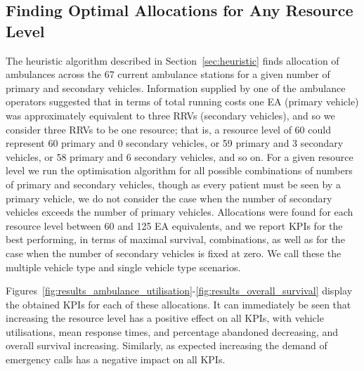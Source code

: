\documentclass[preprint,12pt]{elsarticle}
\begin{document}
\subsection{Finding Optimal Allocations for Any Resource Level}\label{sec:experiments}
The heuristic algorithm described in Section~\ref{sec:heuristic} finds
allocation of ambulances across the 67 current ambulance stations for a given
number of primary and secondary vehicles. Information supplied by one of the
ambulance operators suggested that in terms of total running costs one EA
(primary vehicle) was approximately equivalent to three RRVs (secondary
vehicles), and so we consider three RRVs to be one resource; that is, a
resource level of 60 could represent 60 primary and 0 secondary vehicles, or
59 primary and 3 secondary vehicles, or 58 primary and 6 secondary vehicles,
and so on. For a given resource level we run the optimisation algorithm for
all possible combinations of numbers of primary and secondary vehicles, though
as every patient must be seen by a primary vehicle, we do not consider the
case when the number of secondary vehicles exceeds the number of primary
vehicles.
Allocations were found for each resource level between 60 and 125 EA
equivalents, and we report KPIs for the best performing, in terms of maximal
survival, combinations, as well as for the case when the number of secondary
vehicles is fixed at zero. We call these the multiple vehicle type and single
vehicle type scenarios.

Figures~\ref{fig:results_ambulance_utilisation}-\ref{fig:results_overall_survival}
display the obtained KPIs for each of these allocations. It can immediately be
seen that increasing the resource level has a positive effect on all KPIs,
with vehicle utilisations, mean response times, and percentage abandoned
decreasing, and overall survival increasing. Similarly, as expected increasing
the demand of emergency calls has a negative impact on all KPIs.
\end{document}
